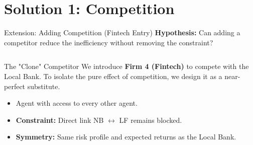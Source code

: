 \documentclass[aspectratio=169]{beamer}
\begin{document}


\section{Solution 1: Competition}

\begin{frame}{Extension: Adding Competition (Fintech Entry)}
    \textbf{Hypothesis:} Can adding a competitor reduce the inefficiency without removing the constraint?
    
    \begin{columns}[T]
            \begin{block}{The "Clone" Competitor}
                We introduce \textbf{Firm 4 (Fintech)} to compete with the Local Bank. To isolate the pure effect of competition, we design it as a near-perfect substitute.
                
                \begin{itemize}
                    \item Agent with access to every other agent.
                    \item \textbf{Constraint:} Direct link NB $\leftrightarrow$ LF remains \textcolor{AlertRed}{blocked}.
                    \item \textbf{Symmetry:} Same risk profile and expected returns as the Local Bank.
                \end{itemize}
            \end{block}
            
            \centering
            
\end{columns}
\end{frame}
\end{document}
